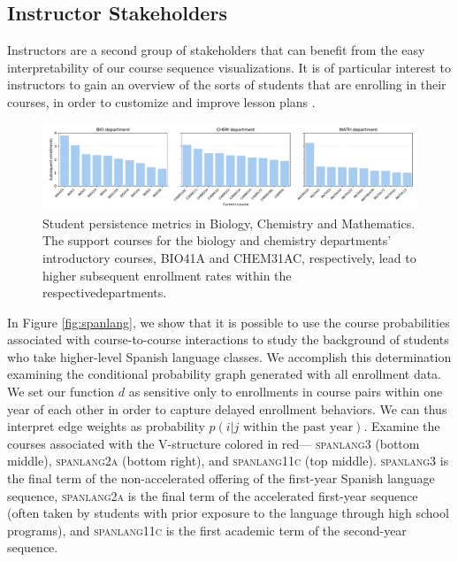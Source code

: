 \documentclass{sigchi}
\begin{document}
\subsection{Instructor Stakeholders}
\label{sec:instructor_stakeholders}

Instructors are a second group of stakeholders that can benefit from
the easy interpretability of our course sequence visualizations. It is
of particular interest to instructors to gain an overview of the sorts
of students that are enrolling in their courses, in order to customize
and improve lesson plans \cite{Leaver2002}.

\begin{figure}[h!]
    \centering
    \includegraphics[width=18cm]{final-persistence.pdf}
    \caption{Student persistence metrics in Biology, Chemistry and
      Mathematics. The support courses for the biology and chemistry
      departments' introductory courses, BIO41A and CHEM31AC,
      respectively, lead to higher subsequent enrollment rates within
      the respectivedepartments.}
    \label{fig:persistence}
\end{figure}

In Figure \ref{fig:spanlang}, we show that it is possible to use the
course probabilities associated with course-to-course interactions to
study the background of students who take higher-level Spanish
language classes. We accomplish this determination examining the
conditional probability graph generated with all enrollment data. We
set our function $d$ as sensitive only to enrollments in course pairs
within one year of each other in order to capture delayed enrollment
behaviors. We can thus interpret edge weights as probability $p(i|j
\text{ within the past year})$. Examine the courses associated with
the V-structure colored in red--- \textsc{spanlang3} (bottom middle),
\textsc{spanlang2a} (bottom right), and \textsc{spanlang11c} (top
middle). \textsc{spanlang3} is the final term of the non-accelerated
offering of the first-year Spanish language sequence,
\textsc{spanlang2a} is the final term of the accelerated first-year
sequence (often taken by students with prior exposure to the language
through high school programs), and \textsc{spanlang11c} is the first
academic term of the second-year sequence.
\end{document}
